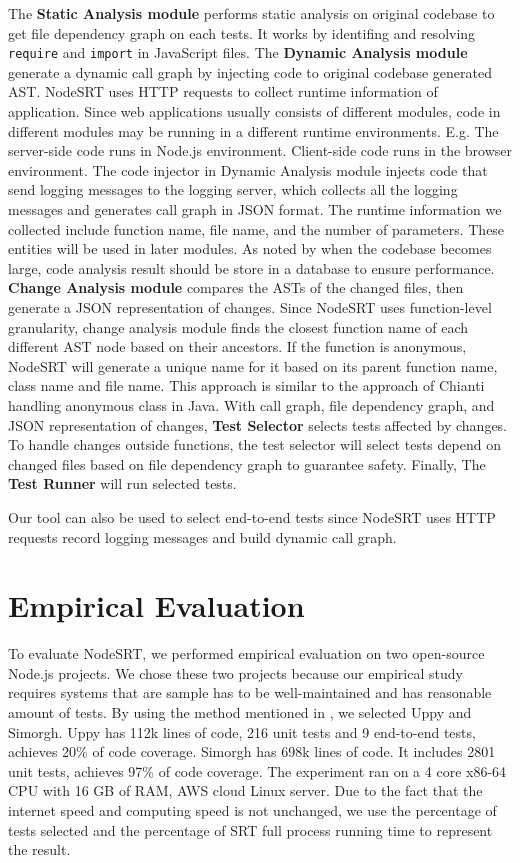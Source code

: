 \documentclass[10pt, conference]{IEEEtran}
\begin{document}
 The \textbf{Static Analysis module} performs static analysis on original codebase to get file dependency
graph on each tests. It works by identifing and resolving \verb|require| and \verb|import| in JavaScript files. 
The \textbf{Dynamic Analysis module} generate a dynamic call graph by injecting code to original codebase 
generated AST. 
NodeSRT uses HTTP requests to collect runtime information of application. Since web applications usually consists of different modules, code in 
different modules may be running in a different runtime environments. E.g. The server-side code runs in Node.js 
environment. Client-side code runs in the browser environment. The code injector in Dynamic Analysis module injects code that send logging messages to 
the logging server, which collects all the logging messages and generates call graph in JSON format. The runtime information we collected include function name, file name, and the number of parameters. 
These entities will be used in later modules. As noted by \cite{b2, b4} when the codebase becomes large, code analysis result should be store in a database to ensure performance. 
\textbf{Change Analysis module} compares the ASTs of the changed files, then generate a JSON representation of changes. Since NodeSRT uses function-level 
granularity, change analysis module finds the closest function name of each different AST node based on their ancestors. 
If the function is anonymous, NodeSRT will generate a unique name for it based on its parent function name, class name and file name. 
This approach is similar to the approach of Chianti \cite{b12} handling anonymous class in Java. With call graph, file dependency graph, 
and JSON representation of changes, \textbf{Test Selector} selects tests affected by changes. To handle changes outside 
functions, the test selector will select tests depend on changed files based on file dependency graph to guarantee safety. 
Finally, The \textbf{Test Runner} will run selected tests.

Our tool can also be used to select end-to-end tests since NodeSRT uses HTTP requests 
record logging messages and build dynamic call graph.

\section{Empirical Evaluation}

To evaluate NodeSRT, we performed empirical evaluation on two open-source Node.js projects. We chose these two projects because 
our empirical study requires systems that are sample has to be well-maintained and has reasonable amount of tests. By using the method mentioned in \cite{b10}, 
we selected Uppy and Simorgh. Uppy has 112k lines of code, 216 unit tests and 9 end-to-end tests, 
achieves 20\% of code coverage. Simorgh has 698k lines of code. 
It includes 2801 unit tests, achieves 97\% of code coverage. The 
experiment ran on a 4 core x86-64 CPU with 16 GB of RAM, AWS cloud Linux server. Due to the fact that the internet speed and computing speed is not 
unchanged, we use the percentage of tests selected and the percentage of SRT full process running time to 
represent the result. 
\end{document}
